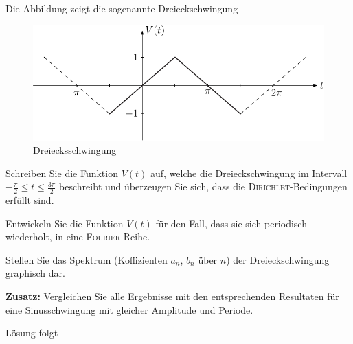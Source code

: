 \documentclass{atistandalonetask}
\begin{document}
  \begin{atiTask}[
    title = Dreiecksschwingung
  ]
	Die Abbildung zeigt die sogenannte Dreieckschwingung
	\begin{figure}[H]
	\centering
	\includegraphics[width=0.7\linewidth]{picture-fourier_iii}
	\caption{Dreiecksschwingung}
	\end{figure}

	\begin{atiSubtasks}
		\item
		Schreiben Sie die Funktion $V(t)$ auf, welche die Dreieckschwingung im Intervall $-\frac{\pi}{2}\leq t\leq \frac{3\pi}{2}$ beschreibt und überzeugen Sie sich, dass die \textsc{Dirichlet}-Bedingungen erfüllt sind.
		\item Entwickeln Sie die Funktion $V(t)$ für den Fall, dass sie sich periodisch wiederholt, in eine \textsc{Fourier}-Reihe. 
		\item Stellen Sie das Spektrum (Koffizienten $a_n$, $b_n$ über $n$) der Dreieckschwingung graphisch dar.
		\item \textbf{Zusatz:} Vergleichen Sie alle Ergebnisse mit den entsprechenden Resultaten für eine Sinusschwingung mit gleicher Amplitude und Periode. 
	\end{atiSubtasks} 
  \end{atiTask}
  \begin{atiSolution}
   Lösung folgt
  \end{atiSolution}
\end{document}
